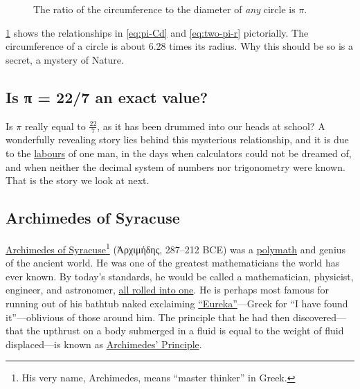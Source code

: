 \documentclass[
  a4paper,
]{article}
\begin{document}
\begin{figure}
\centering

\caption{The ratio of the circumference to the diameter of \emph{any}
circle is \(\pi\).}\label{fig:pi-circle}
\end{figure}

\cref{fig:pi-circle} shows the relationships in \cref{eq:pi-Cd} and
\cref{eq:two-pi-r} pictorially. The circumference of a circle is about
6.28 times its radius. Why this should be so is a secret, a mystery of
Nature.

\subsection{Is π = 22/7 an exact
value?}\label{is-ux3c0-227-an-exact-value}

Is \(\pi\) really equal to \(\frac{22}{7}\), as it has been drummed into
our heads at school? A wonderfully revealing story lies behind this
mysterious relationship, and it is due to the
\href{https://www.collinsdictionary.com/dictionary/english/labours}{labours}
of one man, in the days when calculators could not be dreamed of, and
when neither the decimal system of numbers nor trigonometry were known.
That is the story we look at next.

\subsection{Archimedes of Syracuse}\label{archimedes-of-syracuse}

\href{https://en.wikipedia.org/wiki/Archimedes}{Archimedes of
Syracuse}\footnote{His very name, Archimedes, means ``master thinker''
  in Greek.} (Ἀρχιμήδης, 287--212 BCE) was a
\href{https://www.vocabulary.com/dictionary/polymath\#:~:text=Definitions\%20of\%20polymath,of\%20great\%20and\%20varied\%20learning}{polymath}
and genius of the ancient world. He was one of the greatest
mathematicians the world has ever known. By today's standards, he would
be called a mathematician, physicist, engineer, and astronomer,
\href{https://www.ldoceonline.com/dictionary/all-rolled-into-one}{all
rolled into one}. He is perhaps most famous for running out of his
bathtub naked exclaiming
\href{https://www.dictionary.com/browse/eureka}{``Eureka''}---Greek for
``I have found it''---oblivious of those around him. The principle that
he had then discovered---that the upthrust on a body submerged in a
fluid is equal to the weight of fluid displaced---is known as
\href{https://www.britannica.com/science/Archimedes-principle}{Archimedes'
Principle}.
\end{document}
